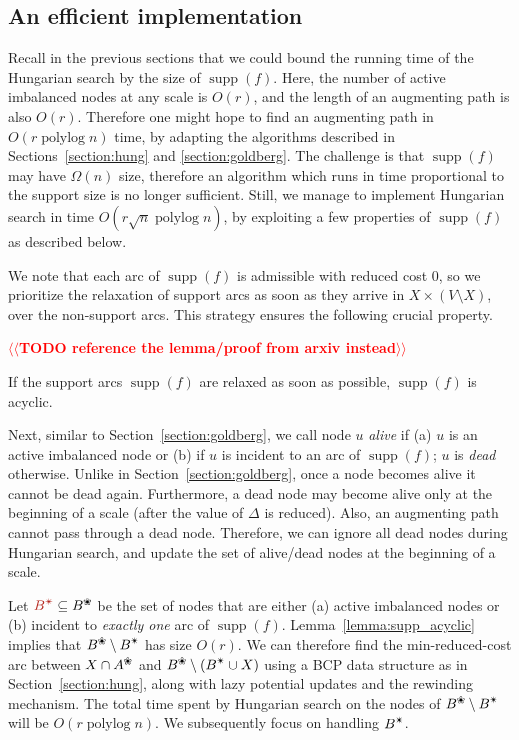 \documentclass[11pt]{article}
\makeatletter
\def\polylog{\mathop{\mathrm{polylog}}}
\def\supp{\operatorname{supp}}
\def\alive#1{{#1}^\text{\ding{96}}}
\def\star{\text{\ding{84}}}
\theoremstyle{plain}
\numberwithin{figure}{section}
\def\EMPH#1{\textcolor{BrickRed}{{\emph{#1}}}}
\def\n@te#1{\textsf{\boldmath \textbf{$\langle\!\langle$#1$\rangle\!\rangle$}}\leavevmode}
\def\note#1{\textcolor{red}{\n@te{#1}}}
\makeatother
\begin{document}
\subsection{An efficient implementation}

Recall in the previous sections that we could bound the running time of the
Hungarian search by the size of $\supp(f)$.
Here, the number of active imbalanced nodes at any scale is $O(r)$, and the
length of an augmenting path is also $O(r)$.
Therefore one might hope to find an augmenting path in $O(r\polylog n)$ time,
by adapting the algorithms described in Sections~\ref{section:hung} and
\ref{section:goldberg}.
The challenge is that $\supp(f)$ may have $\Omega(n)$ size,
therefore an algorithm which runs in time proportional to the support size is no longer
sufficient.
Still, we manage to implement Hungarian search in time $O(r\sqrt{n}\polylog n)$,
by exploiting a few properties of $\supp(f)$ as described below.

We note that each arc of $\supp(f)$ is admissible with reduced cost $0$,
so we prioritize the relaxation of support arcs as soon as they arrive in
$X \times (V \setminus X)$, over the non-support arcs.
This strategy ensures the following crucial property.

\note{TODO reference the lemma/proof from arxiv instead} %
\begin{lemma}
\label{lemma:supp_acyclic}
If the support arcs $\supp(f)$ are relaxed as soon as possible, $\supp(f)$ is acyclic.
\end{lemma}

Next, similar to Section~\ref{section:goldberg}, we call node $u$
\EMPH{alive} if (a) $u$ is an active imbalanced node or (b) if $u$ is incident to
an arc of $\supp(f)$; $u$ is \EMPH{dead} otherwise.
Unlike in Section~\ref{section:goldberg}, once a node becomes alive it cannot
be dead again.
Furthermore, a dead node may become alive only at the beginning of a scale
(after the value of $\Delta$ is reduced).
Also, an augmenting path cannot pass through a dead node.
Therefore, we can ignore all dead nodes during Hungarian search,
and update the set of alive/dead nodes at the beginning of a scale.

Let $\EMPH{$B^\star$} \subseteq \alive{B}$ be the set of nodes that are either (a) active
imbalanced nodes or (b) incident to \emph{exactly one} arc of $\supp(f)$.
Lemma~\ref{lemma:supp_acyclic} implies that $\alive{B} \setminus B^\star$ has size $O(r)$.
%
We can therefore find the min-reduced-cost arc between $X \cap \alive{A}$ and $\alive{B} \setminus (B^\star \cup X)$
using a BCP data structure as in Section~\ref{section:hung}, along with lazy
potential updates and the rewinding mechanism.
The total time spent by Hungarian search on the nodes of $\alive{B} \setminus B^\star$ will be $O(r\polylog n)$.
We subsequently focus on handling $B^\star$.
\end{document}
